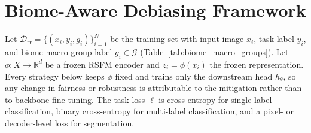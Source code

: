 \documentclass[10pt,twocolumn,letterpaper]{article}
\begin{document}

\section{Biome-Aware Debiasing Framework}

Let \(\mathcal{D}_{\mathrm{tr}}=\{(x_i,y_i,g_i)\}_{i=1}^{N}\) be the training set with input image \(x_i\), task label \(y_i\), and biome macro-group label \(g_i\in\mathcal{G}\) (Table~\ref{tab:biome_macro_groups}). Let \(\phi:X\rightarrow\mathbb{R}^{d}\) be a frozen RSFM encoder and \(z_i=\phi(x_i)\) the frozen representation. Every strategy below keeps \(\phi\) fixed and trains only the downstream head \(h_\theta\), so any change in fairness or robustness is attributable to the mitigation rather than to backbone fine-tuning. The task loss \(\ell\) is cross-entropy for single-label classification, binary cross-entropy for multi-label classification, and a pixel- or decoder-level loss for segmentation.
\end{document}
